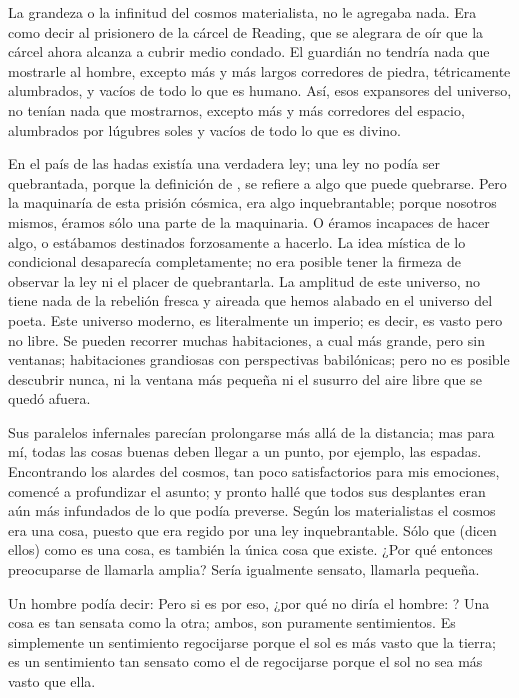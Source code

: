 La grandeza o la infinitud del cosmos materialista, no le agregaba nada. Era como decir al
prisionero de la cárcel de Reading, que se alegrara de oír que la cárcel ahora alcanza a cubrir medio
condado. El guardián no tendría nada que mostrarle al hombre, excepto más y más largos corredores de
piedra, tétricamente alumbrados, y vacíos de todo lo que es humano. Así, esos expansores del universo,
no tenían nada que mostrarnos, excepto más y más corredores del espacio, alumbrados por lúgubres soles
y vacíos de todo lo que es divino.

En el país de las hadas existía una verdadera ley; una ley no podía ser quebrantada, porque la
definición de , se refiere a algo que puede quebrarse. Pero la maquinaría de esta prisión cósmica, era
algo inquebrantable; porque nosotros mismos, éramos sólo una parte de la maquinaria. O éramos
incapaces de hacer algo, o estábamos destinados forzosamente a hacerlo. La idea mística de lo
condicional desaparecía completamente; no era posible tener la firmeza de observar la ley ni el placer de
quebrantarla. La amplitud de este universo, no tiene nada de la rebelión fresca y aireada que hemos
alabado en el universo del poeta. Este universo moderno, es literalmente un imperio; es decir, es vasto
pero no libre. Se pueden recorrer muchas habitaciones, a cual más grande, pero sin ventanas; habitaciones
grandiosas con perspectivas babilónicas; pero no es posible descubrir nunca, ni la ventana más pequeña ni
el susurro del aire libre que se quedó afuera.

Sus paralelos infernales parecían prolongarse más allá de la distancia; mas para mí, todas las cosas
buenas deben llegar a un punto, por ejemplo, las espadas. Encontrando los alardes del cosmos, tan poco
satisfactorios para mis emociones, comencé a profundizar el asunto; y pronto hallé que todos sus
desplantes eran aún más infundados de lo que podía preverse. Según los materialistas el cosmos era una
cosa, puesto que era regido por una ley inquebrantable. Sólo que (dicen ellos) como es una cosa, es
también la única cosa que existe. ¿Por qué entonces preocuparse de llamarla amplia? Sería igualmente
sensato, llamarla pequeña.

Un hombre podía decir:  Pero si es por eso, ¿por qué no diría el hombre: ? Una cosa es tan sensata como la otra; ambos, son puramente sentimientos. Es simplemente un
sentimiento regocijarse porque el sol es más vasto que la tierra; es un sentimiento tan sensato como el de
regocijarse porque el sol no sea más vasto que ella.

